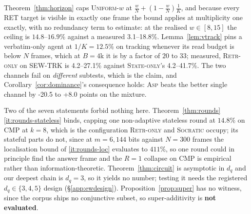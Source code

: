 \documentclass[10pt]{article}
\newcommand{\VN}{300}
\newcommand{\VmBits}{6{,}144}
\newcommand{\VoneOverK}{12.5}
\newcommand{\VUnifRETMin}{3.1}
\newcommand{\VUnifRETMax}{18.8}
\newcommand{\VRetrTRKMin}{4.2}
\newcommand{\VRetrTRKMax}{27.1}
\newcommand{\VStateTRKMin}{4.2}
\newcommand{\VStateTRKMax}{41.7}
\newcommand{\VCorGapMin}{-20.5}
\newcommand{\VCorGapMax}{+8.0}
\newcommand{\VThmTwoMin}{14.8}
\newcommand{\VThmTwoMax}{16.9}
\newcommand{\VwMin}{8}
\newcommand{\VwMax}{15}
\theoremstyle{definition}
\theoremstyle{plain}
\newcommand{\ASP}{\textsc{Asp}}
\begin{document}
Theorem~\ref{thm:horizon} caps \textsc{Uniform-}$w$ at $\frac{w}{N}+(1-\frac{w}{N})\frac1K$, and
because every RET target is visible in exactly one frame the bound applies at multiplicity one
exactly, with no redundancy term to estimate: at the realised $w\in[\VwMin{},\VwMax{}]$ the
ceiling is $\VThmTwoMin{}$--$\VThmTwoMax{}\%$ against a measured \VUnifRETMin{}--\VUnifRETMax{}\%.
Lemma~\ref{lem:vtrack} pins a verbatim-only agent at $1/K=\VoneOverK{}\%$ on tracking whenever
its read budget is below $N$ frames, which at $B{=}4$k it is by a factor of $20$ to $33$;
measured, \textsc{Retr-only} on SEW-TRK is \VRetrTRKMin{}--\VRetrTRKMax{}\% against
\textsc{State-only}'s \VStateTRKMin{}--\VStateTRKMax{}\%. The two channels fail on
\emph{different} subtests, which is the claim, and Corollary~\ref{cor:dominance}'s consequence
holds: \ASP{} beats the better single channel by \VCorGapMin{} to \VCorGapMax{} points on the
mixture.

Two of the seven statements forbid nothing here. Theorem~\ref{thm:rounds}\ref{it:rounds-stateless}
binds, capping one non-adaptive stateless round at $14.8\%$ on CMP at $k{=}8$, which is the
configuration \textsc{Retr-only} and \textsc{Socratic} occupy; its stateful parts do not, since
at $m{=}\VmBits{}$ bits against $N{=}\VN{}$ frames the localisation bound of
\ref{it:rounds-loc} evaluates to $411\%$, so one round could in principle find the answer frame
and the $R{=}1$ collapse on CMP is empirical rather than information-theoretic.
Theorem~\ref{thm:circuit} is asymptotic in $d_q$ and our deepest chain is $d_q{=}3$, so it
yields no number; testing it needs the registered $d_q\in\{3,4,5\}$ design
(\S\ref{app:ewdesign}). Proposition~\ref{prop:super} has no witness, since the corpus ships no
conjunctive subset, so super-additivity is \textbf{not evaluated}.
\end{document}
